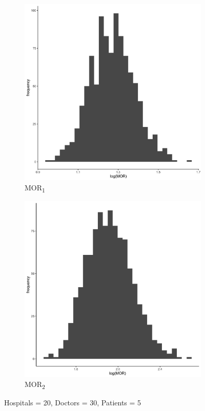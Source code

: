 \documentclass[
  letterpaper,
  DIV=11,
  numbers=noendperiod,
  titlepage]{scrartcl}
\begin{document}
\vspace{10mm}

\begin{figure}
\centering
\begin{subfigure}{.49\textwidth}
    \centering
    \includegraphics[width=.95\linewidth]{../../plots/three-lvl-ran-int/high-prev/hist_20_30_5_three_lvl_high_prev_mor1.png}  
    \caption{MOR\textsubscript{1}}
    \label{l20m30n51}
\end{subfigure}
\begin{subfigure}{.49\textwidth}
    \centering
    \includegraphics[width=.95\linewidth]{../../plots/three-lvl-ran-int/high-prev/hist_20_30_5_three_lvl_high_prev_mor2.png}  
    \caption{MOR\textsubscript{2}}
    \label{l20m30n52}
\end{subfigure}
\caption{Hospitals = 20, Doctors = 30, Patients = 5}
\label{mor1}
\end{figure}
\end{document}
